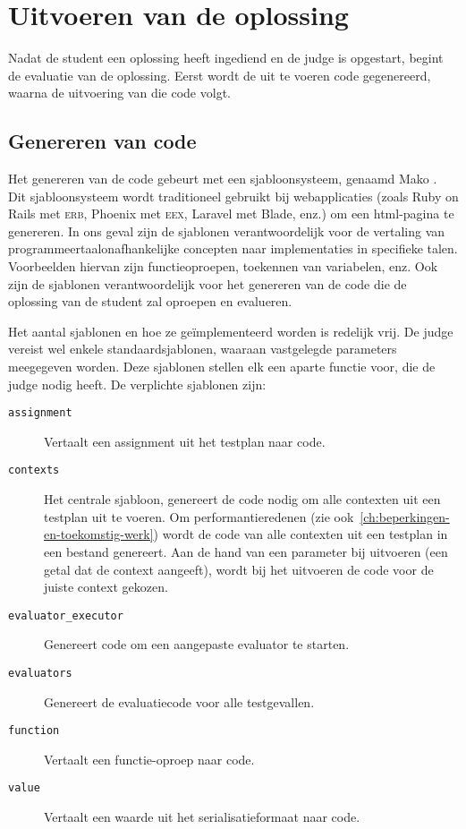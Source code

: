 \section{Uitvoeren van de oplossing}\label{sec:uitvoeren-van-de-oplossing}

Nadat de student een oplossing heeft ingediend en de judge is opgestart, begint de evaluatie van de oplossing.
Eerst wordt de uit te voeren code gegenereerd, waarna de uitvoering van die code volgt.

\subsection{Genereren van code}\label{subsec:genereren-van-code}

Het genereren van de code gebeurt met een sjabloonsysteem, genaamd Mako \autocite{mako}.
Dit sjabloonsysteem wordt traditioneel gebruikt bij webapplicaties (zoals Ruby on Rails met \textsc{erb}, Phoenix met \textsc{eex}, Laravel met Blade, enz.) om een html-pagina te genereren.
In ons geval zijn de sjablonen verantwoordelijk voor de vertaling van programmeertaalonafhankelijke concepten naar implementaties in specifieke talen.
Voorbeelden hiervan zijn functieoproepen, toekennen van variabelen, enz.
Ook zijn de sjablonen verantwoordelijk voor het genereren van de code die de oplossing van de student zal oproepen en evalueren.

Het aantal sjablonen en hoe ze geïmplementeerd worden is redelijk vrij.
De judge vereist wel enkele standaardsjablonen, waaraan vastgelegde parameters meegegeven worden.
Deze sjablonen stellen elk een aparte functie voor, die de judge nodig heeft.
De verplichte sjablonen zijn:
\begin{description}
    \item[\texttt{assignment}] Vertaalt een assignment uit het testplan naar code.
    \item[\texttt{contexts}] Het centrale sjabloon, genereert de code nodig om alle contexten uit een testplan uit te voeren.
    Om performantieredenen (zie ook~\cref{ch:beperkingen-en-toekomstig-werk}) wordt de code van alle contexten uit een testplan in een bestand genereert.
    Aan de hand van een parameter bij uitvoeren (een getal dat de context aangeeft), wordt bij het uitvoeren de code voor de juiste context gekozen.
    \item[\texttt{evaluator\_executor}] Genereert code om een aangepaste evaluator te starten.
    \item[\texttt{evaluators}] Genereert de evaluatiecode voor alle testgevallen.
    \item[\texttt{function}] Vertaalt een functie-oproep naar code.
    \item[\texttt{value}] Vertaalt een waarde uit het serialisatieformaat naar code.
\end{description}

